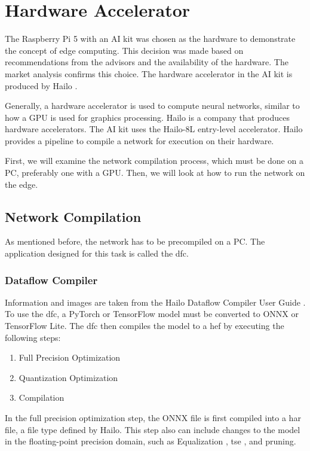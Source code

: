 \chapter{Hardware Accelerator}

The Raspberry Pi 5 with an AI kit was chosen as the hardware to demonstrate the concept of edge computing.  
This decision was made based on recommendations from the advisors and the availability of the hardware.  
The market analysis confirms this choice.  
The hardware accelerator in the AI kit is produced by Hailo \cite{hailo}.  

Generally, a hardware accelerator is used to compute neural networks, similar to how a GPU is used for graphics processing.  
Hailo is a company that produces hardware accelerators.  
The AI kit uses the Hailo-8L entry-level accelerator.  
Hailo provides a pipeline to compile a network for execution on their hardware.  

First, we will examine the network compilation process, which must be done on a PC, preferably one with a GPU.  
Then, we will look at how to run the network on the edge.  

\section{Network Compilation}

As mentioned before, the network has to be precompiled on a PC.  
The application designed for this task is called the \Acrfull{dfc}.  

\subsection{Dataflow Compiler  
\label{section:dfc}}  
Information and images are taken from the Hailo Dataflow Compiler User Guide \cite{hailo_dataflow_compiler}. 
To use the \acrshort{dfc}, a PyTorch or TensorFlow model must be converted to ONNX or TensorFlow Lite.   
The \acrshort{dfc} then compiles the model to a \Acrfull{hef} by executing the following steps:  

\begin{enumerate}
    \item Full Precision Optimization
    \item Quantization Optimization
    \item Compilation
\end{enumerate}

In the full precision optimization step, the ONNX file is first compiled into a \acrfull{har} file, a file type defined by Hailo.  
This step also can include changes to the model in the floating-point precision domain, such as Equalization \cite{meller2019same}, \acrshort{tse} \cite{Vosco_2021_ICCV}, and pruning.  

